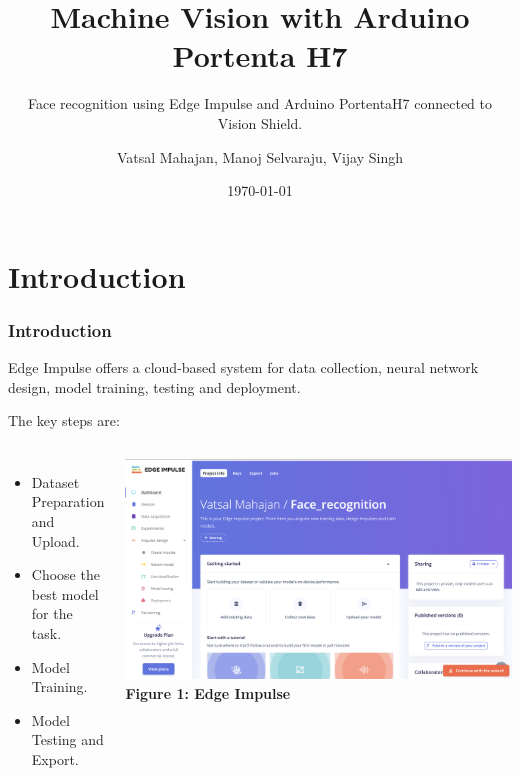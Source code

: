 \documentclass[10pt, a4paper]{beamer}
\title{Machine Vision with Arduino Portenta H7}
\subtitle{Face recognition using Edge Impulse and Arduino PortentaH7 connected to Vision Shield.}
\author{Vatsal Mahajan, Manoj Selvaraju, Vijay Singh}
\date{\today}
\begin{document}
	
	
	
	\section{Introduction}

\begin{frame}
	\frametitle{Introduction}
	
	\begin{block}{}
		Edge Impulse offers a cloud-based system for data collection, neural network design, model training, testing and deployment.
	\end{block}
	
   \begin{block}{The key steps are:}
	\begin{columns}
		
		\begin{itemize}
			\item Dataset Preparation and Upload.
			\item Choose the best model for the task.
			\item Model Training.
			\item Model Testing and Export.
		\end{itemize}
		
		\centering
		\includegraphics[width=1\textwidth]{images/EdgeImpulse.png}
		\textbf{Figure 1: Edge Impulse}
		
	\end{columns}
\end{block}
\end{frame}
		

	
\end{document}
